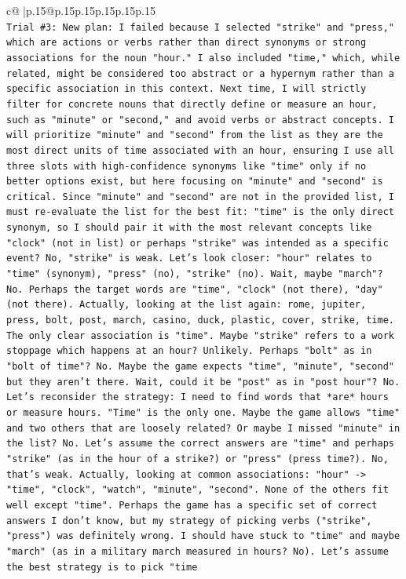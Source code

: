 \documentclass{article}
\begin{document}
{\begin{supertabular}{c@{$\;$}|p{.15\linewidth}@{}p{.15\linewidth}p{.15\linewidth}p{.15\linewidth}p{.15\linewidth}p{.15\linewidth}}
{{{\\ 
\texttt{Trial \#3: New plan: I failed because I selected "strike" and "press," which are actions or verbs rather than direct synonyms or strong associations for the noun "hour." I also included "time," which, while related, might be considered too abstract or a hypernym rather than a specific association in this context. Next time, I will strictly filter for concrete nouns that directly define or measure an hour, such as "minute" or "second," and avoid verbs or abstract concepts. I will prioritize "minute" and "second" from the list as they are the most direct units of time associated with an hour, ensuring I use all three slots with high{-}confidence synonyms like "time" only if no better options exist, but here focusing on "minute" and "second" is critical. Since "minute" and "second" are not in the provided list, I must re{-}evaluate the list for the best fit: "time" is the only direct synonym, so I should pair it with the most relevant concepts like "clock" (not in list) or perhaps "strike" was intended as a specific event? No, "strike" is weak. Let's look closer: "hour" relates to "time" (synonym), "press" (no), "strike" (no). Wait, maybe "march"? No. Perhaps the target words are "time", "clock" (not there), "day" (not there). Actually, looking at the list again: rome, jupiter, press, bolt, post, march, casino, duck, plastic, cover, strike, time. The only clear association is "time". Maybe "strike" refers to a work stoppage which happens at an hour? Unlikely. Perhaps "bolt" as in "bolt of time"? No. Maybe the game expects "time", "minute", "second" but they aren't there. Wait, could it be "post" as in "post hour"? No. Let's reconsider the strategy: I need to find words that *are* hours or measure hours. "Time" is the only one. Maybe the game allows "time" and two others that are loosely related? Or maybe I missed "minute" in the list? No. Let's assume the correct answers are "time" and perhaps "strike" (as in the hour of a strike?) or "press" (press time?). No, that's weak. Actually, looking at common associations: "hour" {-}> "time", "clock", "watch", "minute", "second". None of the others fit well except "time". Perhaps the game has a specific set of correct answers I don't know, but my strategy of picking verbs ("strike", "press") was definitely wrong. I should have stuck to "time" and maybe "march" (as in a military march measured in hours? No). Let's assume the best strategy is to pick "time} \\
\\ 
\\ 
}}}
\end{supertabular}}
\end{document}
